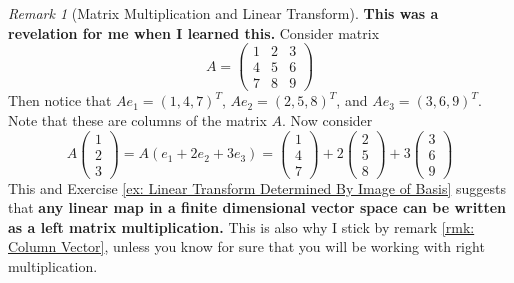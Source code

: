 \documentclass[12pt, a4paper]{article}
\theoremstyle{remark}
\newtheorem{remark}{Remark}
\theoremstyle{definition}
\numberwithin{equation}{section}
\numberwithin{definition}{section}
\numberwithin{example}{section}
\numberwithin{exercise}{section}
\numberwithin{remark}{section}
\numberwithin{figure}{section}
\begin{document}
\begin{remark}[Matrix Multiplication and Linear Transform]
    \label{rmk: Matrix Multiplication and Linear Transform}
    \textbf{This was a revelation for me when I learned this.}
    Consider matrix
    \begin{equation*}
        A =
        \begin{pmatrix}
            1 & 2 & 3 \\
            4 & 5 & 6 \\
            7 & 8 & 9
        \end{pmatrix}
    \end{equation*}
    Then notice that $Ae_1 = \left( 1,4,7 \right)^T$,
    $Ae_2 = \left( 2,5,8 \right)^T$,
    and $Ae_3 = \left( 3,6,9 \right)^T$.
    Note that these are columns of the matrix $A$.
    Now consider
    \begin{equation*}
        A
        \begin{pmatrix}
            1 \\ 2 \\ 3
        \end{pmatrix}
        = A \left( e_1 + 2 e_2 + 3 e_3 \right)
        =
        \begin{pmatrix}
            1 \\ 4 \\ 7
        \end{pmatrix}
        +
        2
        \begin{pmatrix}
            2 \\ 5 \\ 8
        \end{pmatrix}
        +
        3
        \begin{pmatrix}
            3 \\ 6 \\ 9
        \end{pmatrix}
    \end{equation*}
    This and Exercise \ref{ex: Linear Transform Determined By Image of Basis} suggests that
    \textbf{any linear map in a finite dimensional vector space can be written as a left matrix multiplication.}
    This is also why I stick by remark \ref{rmk: Column Vector},
    unless you know for sure that you will be working with right multiplication.
\end{remark}
\end{document}
